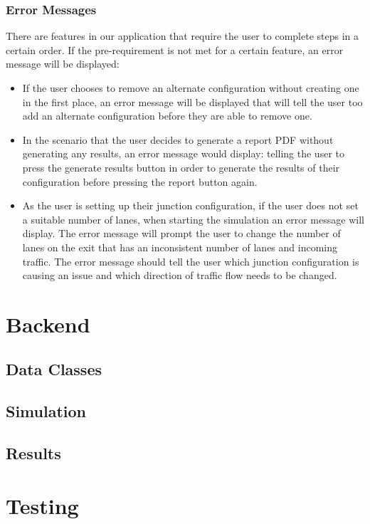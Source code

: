 \documentclass{article}
\begin{document}
    \subsubsection{Error Messages}
    There are features in our application that require the user to complete steps in a certain order. If the pre-requirement is not met for a certain feature, an error message will be displayed:
    \begin{itemize}
        \item If the user chooses to remove an alternate configuration without creating one in the first place, an error message will be displayed that will tell the user too add an alternate configuration before they are able to remove one.
        \item In the scenario that the user decides to generate a report PDF without generating any results, an error message would display: telling the user to press the generate results button in order to generate the results of their configuration before pressing the report button again.
        \item As the user is setting up their junction configuration, if the user does not set a suitable number of lanes, when starting the simulation an error message will display. The error message will prompt the user to change the number of lanes on the exit that has an inconsistent number of lanes and incoming traffic. The error message should tell the user which junction configuration is causing an issue and which direction of traffic flow needs to be changed.
    \end{itemize}

\section{Backend}

    \subsection{Data Classes}

    \subsection{Simulation}

    \subsection{Results}

\section{Testing}
\end{document}
